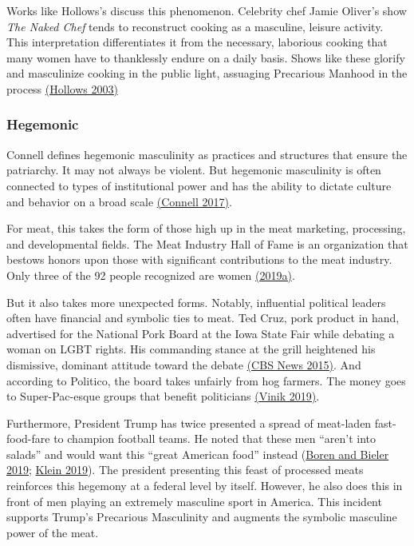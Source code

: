 \documentclass[twoside]{report}
\begin{document}
Works like Hollows's discuss this phenomenon. Celebrity chef Jamie Oliver's show \emph{The Naked Chef} tends to reconstruct cooking as a masculine, leisure activity. This interpretation differentiates it from the necessary, laborious cooking that many women have to thanklessly endure on a daily basis. Shows like these glorify and masculinize cooking in the public light, assuaging Precarious Manhood in the process \hyperlink{hollows}{(Hollows 2003)}

\subsubsection{Hegemonic}

Connell defines hegemonic masculinity as practices and structures that
ensure the patriarchy. It may not always be violent. But hegemonic
masculinity is often connected to types of institutional power and has
the ability to dictate culture and behavior on a broad scale \hyperlink{connell}{(Connell 2017)}.

For meat, this takes the form of those high up in the meat marketing,
processing, and developmental fields. The Meat Industry Hall of Fame is an
organization that bestows honors upon those with significant
contributions to the meat industry. Only three of the 92 people
recognized are women \hyperlink{2019a}{(2019a)}.

But it also takes more unexpected forms. Notably, influential political
leaders often have financial and symbolic ties to meat. Ted Cruz, pork
product in hand, advertised for the National Pork Board at the Iowa
State Fair while debating a woman on LGBT rights. His commanding stance
at the grill heightened his dismissive, dominant attitude toward the
debate \hyperlink{cbs}{(CBS News 2015)}. And according to Politico, the board takes unfairly from hog farmers. The money goes to Super-Pac-esque groups that
benefit politicians \hyperlink{vinik}{(Vinik 2019)}.

Furthermore, President Trump has twice presented a spread of meat-laden
fast-food-fare to champion football teams. He noted that these men
``aren't into salads'' and would want this ``great American food''
instead (\hyperlink{boren}{Boren and Bieler 2019}; \hyperlink{klein}{Klein 2019}). The president presenting this feast of processed meats reinforces this hegemony at a federal level by itself. However, he also does this in front of men playing an extremely masculine sport in America. This incident supports Trump's Precarious Masculinity and augments the symbolic masculine power of the meat.
\end{document}
